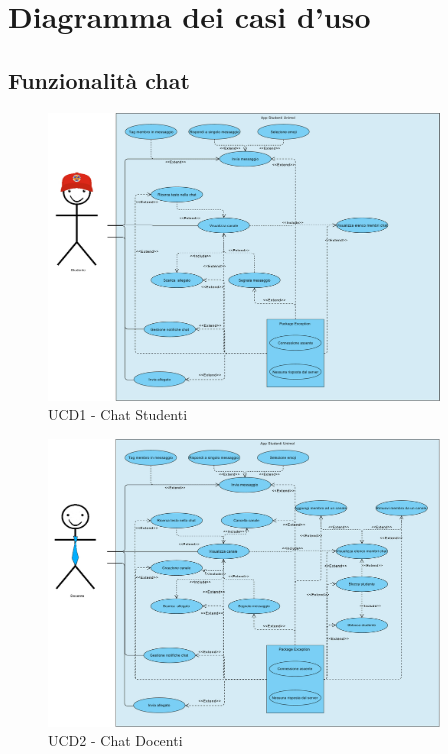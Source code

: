 \section{Diagramma dei casi d'uso}

\subsection{Funzionalità chat}

\begin{figure}
	\centering
	\includegraphics[height=3in]{imgs/gruppo6/use_case_diagrams/ucd1_chat_studenti.pdf}
	\caption{UCD1 - Chat Studenti}
	\label{fig:ucd1-stud}
\end{figure}

\begin{figure}
	\centering
	\includegraphics[height=3in]{imgs/gruppo6/use_case_diagrams/ucd2_chat_docenti.pdf}
	\caption{UCD2 - Chat Docenti}
	\label{fig:ucd2-doc}
\end{figure}

